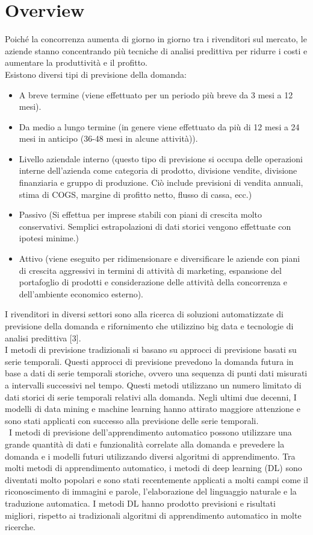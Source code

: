 \documentclass[12pt,a4paper]{report}
\begin{document}
\section{Overview}
Poiché la concorrenza aumenta di giorno in giorno tra i rivenditori sul mercato, le aziende stanno concentrando più tecniche di analisi predittiva per ridurre i costi e aumentare la produttività e il profitto.\\
Esistono diversi tipi di previsione della domanda:
\begin{itemize}
    \item A breve termine (viene effettuato per un periodo più breve da 3 mesi a 12 mesi). 
    \item Da medio a lungo termine (in genere viene effettuato da più di 12 mesi a 24 mesi in anticipo (36-48 mesi in alcune attività)).
    \item Livello aziendale interno (questo tipo di previsione si occupa delle operazioni interne dell'azienda come categoria di prodotto, divisione vendite, divisione finanziaria e gruppo di produzione. Ciò include previsioni di vendita annuali, stima di COGS, margine di profitto netto, flusso di cassa, ecc.)
    \item Passivo (Si effettua per imprese stabili con piani di crescita molto conservativi. Semplici estrapolazioni di dati storici vengono effettuate con ipotesi minime.)
    \item Attivo (viene eseguito per ridimensionare e diversificare le aziende con piani di crescita aggressivi in termini di attività di marketing, espansione del portafoglio di prodotti e considerazione delle attività della concorrenza e dell'ambiente economico esterno).
\end{itemize}

I rivenditori in diversi settori sono alla ricerca di soluzioni automatizzate di previsione della domanda e rifornimento che utilizzino big data e tecnologie di analisi predittiva [3]. \\
I metodi di previsione tradizionali si basano su approcci di previsione basati su serie temporali. Questi approcci di previsione prevedono la domanda futura in base a dati di serie temporali storiche, ovvero una sequenza di punti dati misurati a intervalli successivi nel tempo. Questi metodi utilizzano un numero limitato di dati storici di serie temporali relativi alla domanda. Negli ultimi due decenni, I modelli di data mining e machine learning hanno attirato maggiore attenzione e sono stati applicati con successo alla previsione delle serie temporali.\\\
I metodi di previsione dell'apprendimento automatico possono utilizzare una grande quantità di dati e funzionalità correlate alla domanda e prevedere la domanda e i modelli futuri utilizzando diversi algoritmi di apprendimento. Tra molti metodi di apprendimento automatico, i metodi di deep learning (DL) sono diventati molto popolari e sono stati recentemente applicati a molti campi come il riconoscimento di immagini e parole, l'elaborazione del linguaggio naturale e la traduzione automatica.
I metodi DL hanno prodotto previsioni e risultati migliori, rispetto ai tradizionali algoritmi di apprendimento automatico in molte ricerche. 
\end{document}
